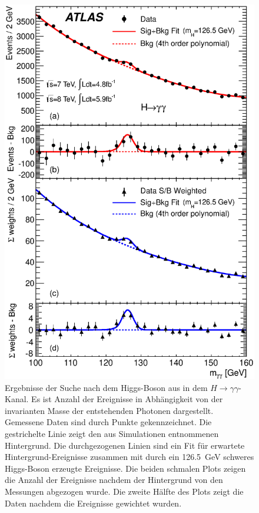 \begin{figure}
\includegraphics[scale = 0.5]{input/mggweighted_panel_nonorm.eps}\caption{Ergebnisse der Suche nach dem Higgs-Boson aus \cite{Aad:2012tfa} in dem $H \rightarrow \gamma\gamma$-Kanal. Es ist Anzahl der Ereignisse in Abhängigkeit von der invarianten Masse der entstehenden Photonen dargestellt. Gemessene Daten sind durch Punkte gekennzeichnet. Die gestrichelte Linie zeigt den aus Simulationen entnommenen Hintergrund. Die durchgezogenen Linien sind ein Fit für erwartete Hintergrund-Ereignisse zusammen mit durch ein 126.5~GeV schweres Higgs-Boson erzeugte Ereignisse. Die beiden schmalen Plots zeigen die Anzahl der Ereignisse nachdem der Hintergrund von den Messungen abgezogen wurde. Die zweite Hälfte des Plots zeigt die Daten nachdem die Ereignisse gewichtet wurden.}\label{fig:higgsdiscovery}
\end{figure}

